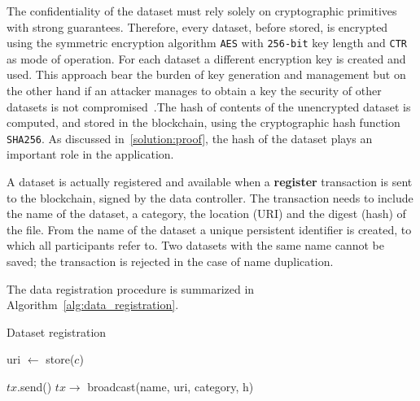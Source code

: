 The confidentiality of the dataset must rely solely on cryptographic primitives with strong guarantees. Therefore, every dataset, before stored, is encrypted using the symmetric encryption algorithm \verb|AES| with \verb|256-bit| key length and \verb|CTR| as mode of operation. For each dataset a different encryption key is created and used. This approach bear the burden of key generation and management but on the other hand if an attacker manages to obtain a key the security of other datasets is not compromised~\cite{schneier1997improved}.The hash of contents of the unencrypted dataset is computed, and stored in the blockchain, using the cryptographic hash function \verb|SHA256|. As discussed in~\ref{solution:proof}, the hash of the dataset plays an important role in the application.

A dataset is actually registered and available when a \textbf{register} transaction is sent to the blockchain, signed by the data controller. The transaction needs to include the name of the dataset, a category, the location (URI) and the digest (hash) of the file. From the name of the dataset a unique persistent identifier is created, to which all participants refer to. Two datasets with the same name cannot be saved; the transaction is rejected in the case of name duplication.

The data registration procedure is summarized in Algorithm~\ref{alg:data_registration}.

\begin{algorithm}[!htb]
  \caption{Dataset registration}\label{alg:data_registration}
  \begin{algorithmic}[1]
       
       
       
      \State uri $\leftarrow$ store($c$) 
      \State {}
  \EndFunction

         
         
        \State $tx$.send() 
        \State {}
  \EndFunction
     
    \State $tx \rightarrow$ broadcast(name, uri, category, h) 
    \State {}
  \EndProcedure
  \end{algorithmic}
\end{algorithm}

